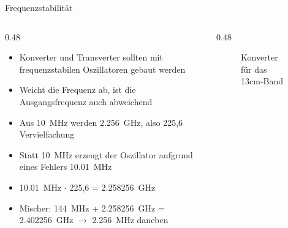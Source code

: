 \begin{frame}

\end{frame}


\begin{frame}{Frequenzstabilität}
    \begin{columns}
        \begin{column}{0.48\textwidth}
            \begin{itemize}
                \item Konverter und Transverter sollten mit frequenzstabilen Oszillatoren gebaut werden
                \item Weicht die Frequenz ab, ist die Ausgangsfrequenz auch abweichend
                \item Aus \qty{10}{\mega\hertz} werden \qty{2,256}{\giga\hertz}, also 225,6 Vervielfachung
                \item Statt \qty{10}{\mega\hertz} erzeugt der Oszillator aufgrund eines Fehlers \qty{10,01}{\mega\hertz}
                \item \qty{10,01}{\mega\hertz} $\cdot$ 225,6 = \qty{2,258256}{\giga\hertz}
                \item Mischer: \qty{144}{\mega\hertz} + \qty{2,258256}{\giga\hertz} = \qty{2,402256}{\giga\hertz} $\rightarrow$ \qty{2,256}{\mega\hertz} daneben
            \end{itemize}
        \end{column}
        \begin{column}{0.48\textwidth}
            \begin{figure}
                \caption{\scriptsize Konverter für das 13cm-Band}
                \label{e_konverter_13cm}
            \end{figure}
        \end{column}
    \end{columns}
\end{frame}%

